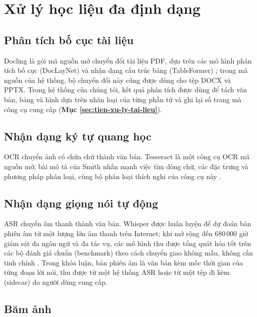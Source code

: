
\section{Xử lý học liệu đa định dạng}

\subsection{Phân tích bố cục tài liệu}

Docling là gói mã nguồn mở chuyển đổi tài liệu PDF, dựa trên các mô hình phân tích bố cục (DocLayNet) và nhận dạng cấu trúc bảng (TableFormer) \cite{auer2024docling}; trong mã nguồn của hệ thống, bộ chuyển đổi này cũng được dùng cho tệp DOCX và PPTX. Trong hệ thống của chúng tôi, kết quả phân tích được dùng để tách văn bản, bảng và hình dựa trên nhãn loại của từng phần tử và ghi lại số trang mà công cụ cung cấp (\textbf{Mục \ref{sec:tien-xu-ly-tai-lieu}}).

\subsection{Nhận dạng ký tự quang học}

OCR chuyển ảnh có chứa chữ thành văn bản. Tesseract là một công cụ OCR mã nguồn mở; bài mô tả của Smith nhấn mạnh việc tìm dòng chữ, các đặc trưng và phương pháp phân loại, cùng bộ phân loại thích nghi của công cụ này \cite{smith2007tesseract}.

\subsection{Nhận dạng giọng nói tự động}

ASR chuyển âm thanh thành văn bản. Whisper được huấn luyện để dự đoán bản phiên âm từ một lượng lớn âm thanh trên Internet; khi mở rộng đến 680\,000 giờ giám sát đa ngôn ngữ và đa tác vụ, các mô hình thu được tổng quát hóa tốt trên các bộ đánh giá chuẩn (benchmark) theo cách chuyển giao không mẫu, không cần tinh chỉnh \cite{radford2023whisper}. Trong khóa luận, bản phiên âm là văn bản kèm mốc thời gian của từng đoạn lời nói, thu được từ một hệ thống ASR hoặc từ một tệp đi kèm (sidecar) do người dùng cung cấp.

\subsection{Băm ảnh}

